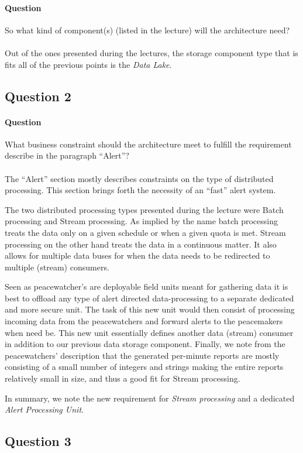 \documentclass[11pt]{article}
\begin{document}
\paragraph{Question} So what kind of component(s) (listed in the lecture) will
the architecture need?\\\\
Out of the ones presented during the lectures, the storage component type that
is fits all of the previous points is the \textit{Data Lake}.
\subsection{Question 2}
\paragraph{Question} What business constraint should the architecture meet to
fulfill the requirement describe in the paragraph ``Alert''?\\\\ The ``Alert''
section mostly describes constraints on the type of distributed processing. This
section brings forth the necessity of an ``fast'' alert system.\par The two
distributed processing types presented during the lecture were Batch processing
and Stream processing. As implied by the name batch processing treats the data
only on a given schedule or when a given quota is met. Stream processing on the
other hand treats the data in a continuous matter. It also allows for multiple
data buses for when the data needs to be redirected to multiple (stream)
consumers.\par Seen as peacewatcher's are deployable field units meant for
gathering data it is best to offload any type of alert directed data-processing
to a separate dedicated and more secure unit. The task of this new unit would
then consist of processing incoming data from the peacewatchers and forward
alerts to the peacemakers when need be. This new unit essentially defines
another data (stream) consumer in addition to our previous data storage
component. Finally, we note from the peacewatchers' description that the
generated per-minute reports are mostly consisting of a small number of integers
and strings making the entire reports relatively small in size, and thus a good
fit for Stream processing.\par In summary, we note the new requirement for
\textit{Stream processing} and a dedicated \textit{Alert Processing Unit}.
\subsection{Question 3}
\end{document}
